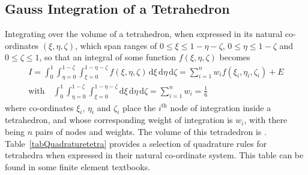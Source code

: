 \subsection{Gauss Integration of a Tetrahedron}

Integrating over the volume of a tetrahedron, when expressed in its natural co-ordinates $( \xi , \eta , \zeta )$, which span ranges of $0 \leq \xi \leq 1 - \eta - \zeta$, $0 \leq \eta \leq 1 - \zeta$ and $0 \leq \zeta \leq 1$, so that an integral of some function $f ( \xi , \eta , \zeta )$ becomes
\begin{multline}
     I = \int_0^1 \int_{\eta=0}^{1-\zeta} \int_{\xi = 0}^{1 - \eta - \zeta} 
     f ( \xi , \eta , \zeta ) \, \mathrm{d} \xi \, \mathrm{d} \eta \, 
     \mathrm{d} \zeta = \sum_{i=1}^n w_i f( \xi_i , \eta_i , \zeta_i ) + E \\
     \text{with} \quad 
     \int_0^1 \int_{\eta=0}^{1-\zeta} \int_{\xi = 0}^{1 - \eta - \zeta} 
     \mathrm{d} \xi \, \mathrm{d} \eta \, \mathrm{d} \zeta = \sum_{i=1}^n w_i = 
     \frac{1}{6}
\end{multline}
where co-ordinates $\xi_i$, $\eta_i$ and $\zeta_i$ place the $i^{\text{th}}$ node of integration inside a tetrahedron, and whose corresponding weight of integration is $w_i$, with there being $n$ pairs of nodes and weights.  The volume of this tetradedron is .  Table~\ref{tabQuadraturetetra} provides a selection of quadrature rules for tetrahedra when expressed in their natural co-ordinate system.  This table can be found in some finite element textbooks.

